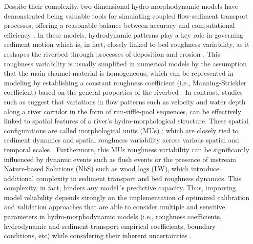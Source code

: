 \documentclass[draft,linenumbers,onecolumn]{agujournal2019} %
\begin{document}
Despite their complexity, two-dimensional hydro-morphodynamic models have demonstrated being valuable tools for simulating coupled flow-sediment transport processes, offering a reasonable balance between accuracy and computational efficiency \cite{papanicolaou2008sediment}. In these models, hydrodynamic patterns play a key role in governing sediment motion which is, in fact, closely linked to bed roughness variability, as it reshapes the riverbed through processes of deposition and erosion \cite{lokin2023effect,mishra2020alluvial}. This roughness variability is usually simplified in numerical models by the assumption that the main channel material is homogeneous, which can be represented in modeling by establishing a constant roughness coefficient (i.e., Manning-Strickler coefficient) based on the general properties of the riverbed \cite{chow1959openchannel}. In contrast, studies such as  suggest that variations in flow patterns such as velocity and water depth along a river corridor in the form of run-riffle-pool sequences, can be effectively linked to spatial features of a river’s hydro-morphological structure. These spatial configurations are called morphological units (MUs) \cite{wadeson1994geomorphological,wyrick2014geospatial}; which are closely tied to sediment dynamics and spatial roughness variability across various spatial and temporal scales \cite{bunte2001samplinga}. Furthermore, this MUs roughness variability can be significantly influenced by dynamic events such as flush events or the presence of instream Nature-based Solutions (NbS) such as wood logs (LW), which introduce additional complexity in sediment transport and bed roughness dynamics.  This complexity, in fact, hinders any model´s predictive capacity. Thus, improving model reliability depends strongly on the implementation of optimized calibration and validation approaches that are able to consider multiple and sensitive parameters in hydro-morphodynamic models (i.e., roughness coefficients, hydrodynamic and sediment transport empirical coefficients, boundary conditions, etc) while considering their inherent uncertainties \cite{guerrero2012calibration,li2011twodimensional,bel2020calibration,scolari2025hydromorphodynamic}.
\end{document}
